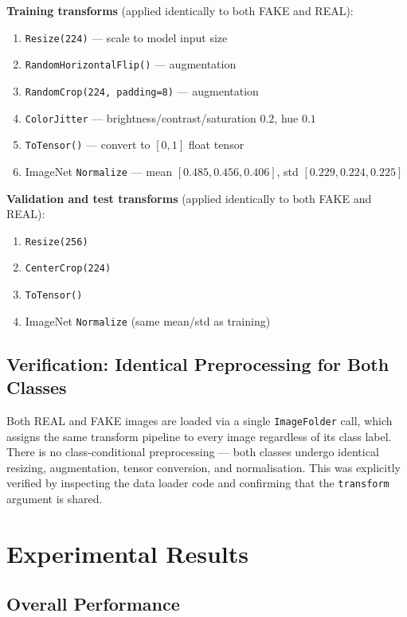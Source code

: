 \documentclass[12pt,a4paper]{article}
\begin{document}
\textbf{Training transforms} (applied identically to both FAKE and REAL):
\begin{enumerate}[noitemsep]
    \item \texttt{Resize(224)} --- scale to model input size
    \item \texttt{RandomHorizontalFlip()} --- augmentation
    \item \texttt{RandomCrop(224, padding=8)} --- augmentation
    \item \texttt{ColorJitter} --- brightness/contrast/saturation $0.2$, hue $0.1$
    \item \texttt{ToTensor()} --- convert to $[0, 1]$ float tensor
    \item ImageNet \texttt{Normalize} --- mean $[0.485, 0.456, 0.406]$, std $[0.229, 0.224, 0.225]$
\end{enumerate}

\textbf{Validation and test transforms} (applied identically to both FAKE and REAL):
\begin{enumerate}[noitemsep]
    \item \texttt{Resize(256)}
    \item \texttt{CenterCrop(224)}
    \item \texttt{ToTensor()}
    \item ImageNet \texttt{Normalize} (same mean/std as training)
\end{enumerate}

\subsection{Verification: Identical Preprocessing for Both Classes}
\label{sec:preprocess}

Both REAL and FAKE images are loaded via a single \texttt{ImageFolder} call, which assigns the same transform pipeline to every image regardless of its class label. There is no class-conditional preprocessing --- both classes undergo identical resizing, augmentation, tensor conversion, and normalisation. This was explicitly verified by inspecting the data loader code and confirming that the \texttt{transform} argument is shared.

\section{Experimental Results}

\subsection{Overall Performance}
\end{document}
